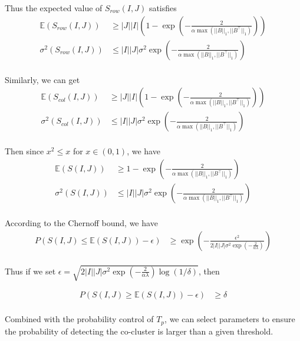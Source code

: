 Thus the expected value of $S_{row}(I,J)$ satisfies
\begin{align*}
    \mathbb{E}(S_{row}(I,J)) & \ge |J||I| \left(1 - \exp(-\frac{2}{\alpha \max(||B||_1, ||B^\top||_1)}) \right) \\
    \sigma^2(S_{row}(I,J))   & \le |I||J| \sigma^2 \exp(-\frac{2}{\alpha \max(||B||_1, ||B^\top||_1)})          \\
\end{align*}

Similarly, we can get
\begin{align*}
    \mathbb{E}(S_{col}(I,J)) & \ge |J||I| \left(1 - \exp(-\frac{2}{\alpha \max(||B||_1, ||B^\top||_1)}) \right) \\
    \sigma^2(S_{col}(I,J))   & \le |I||J| \sigma^2 \exp(-\frac{2}{\alpha \max(||B||_1, ||B^\top||_1)})          \\
\end{align*}

Then since $x^2 \le x$ for $x \in (0,1)$, we have
\begin{align*}
    \mathbb{E}(S(I,J)) & \ge 1 - \exp(-\frac{2}{\alpha \max(||B||_1, ||B^\top||_1)})             \\
    \sigma^2(S(I,J))   & \le |I||J| \sigma^2 \exp(-\frac{2}{\alpha \max(||B||_1, ||B^\top||_1)}) \\
\end{align*}

According to the Chernoff bound, we have
\begin{align*}
    P(S(I,J) \le \mathbb{E}(S(I,J)) - \epsilon)
     & \ge \exp(-\frac{\epsilon^2}{2|I||J| \sigma^2 \exp(-\frac{2}{\alpha \lambda})}) \\
\end{align*}

Thus if we set $\epsilon = \sqrt{2|I||J| \sigma^2 \exp(-\frac{2}{\alpha \lambda}) \log(1/\delta)}$, then

\begin{align*}
    P(S(I,J) \ge \mathbb{E}(S(I,J)) - \epsilon) & \ge \delta \\
\end{align*}

Combined with the probability control of $T_p$, we can select parameters to ensure the probability of detecting the co-cluster is larger than a given threshold.


